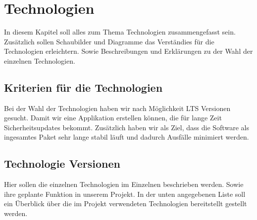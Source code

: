 \section{Technologien}
In diesem Kapitel soll alles zum Thema Technologien zusammengefasst sein.
Zusätzlich sollen Schaubilder und Diagramme das Verständies für die Technologien erleichtern.
Sowie Beschreibungen und Erklärungen zu der Wahl der einzelnen Technologien.

\subsection{Kriterien für die Technologien}
Bei der Wahl der Technologien haben wir nach Möglichkeit LTS Versionen gesucht.
Damit wir eine Applikation erstellen können, die für lange Zeit Sicherheitsupdates
bekommt. Zusätzlich haben wir als Ziel, dass die Software als ingesamtes Paket sehr lange
stabil läuft und dadurch Ausfälle minimiert werden.

\subsection{Technologie Versionen}
Hier sollen die einzelnen Technologien im Einzelnen beschrieben werden.
Sowie ihre geplante Funktion in unserem Projekt.
In der unten angegebenen Liste soll ein Überblick über die im Projekt verwendeten Technologien bereitstellt gestellt werden.

